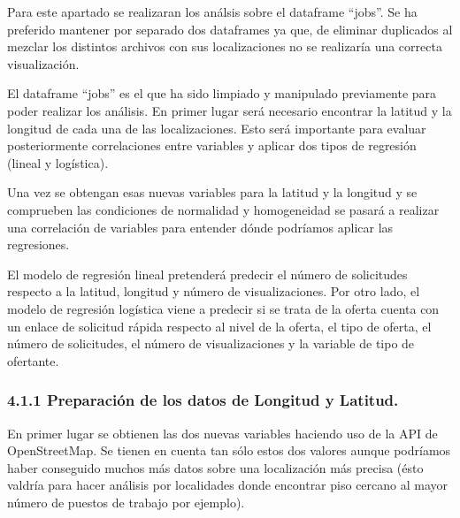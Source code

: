 \documentclass[
]{article}
\begin{document}
Para este apartado se realizaran los análsis sobre el dataframe
``jobs''. Se ha preferido mantener por separado dos dataframes ya que,
de eliminar duplicados al mezclar los distintos archivos con sus
localizaciones no se realizaría una correcta visualización.

El dataframe ``jobs'' es el que ha sido limpiado y manipulado
previamente para poder realizar los análisis. En primer lugar será
necesario encontrar la latitud y la longitud de cada una de las
localizaciones. Esto será importante para evaluar posteriormente
correlaciones entre variables y aplicar dos tipos de regresión (lineal y
logística).

Una vez se obtengan esas nuevas variables para la latitud y la longitud
y se comprueben las condiciones de normalidad y homogeneidad se pasará a
realizar una correlación de variables para entender dónde podríamos
aplicar las regresiones.

El modelo de regresión lineal pretenderá predecir el número de
solicitudes respecto a la latitud, longitud y número de visualizaciones.
Por otro lado, el modelo de regresión logística viene a predecir si se
trata de la oferta cuenta con un enlace de solicitud rápida respecto al
nivel de la oferta, el tipo de oferta, el número de solicitudes, el
número de visualizaciones y la variable de tipo de ofertante.

\hypertarget{preparaciuxf3n-de-los-datos-de-longitud-y-latitud.}{%
\subsubsection{4.1.1 Preparación de los datos de Longitud y
Latitud.}\label{preparaciuxf3n-de-los-datos-de-longitud-y-latitud.}}

En primer lugar se obtienen las dos nuevas variables haciendo uso de la
API de OpenStreetMap. Se tienen en cuenta tan sólo estos dos valores
aunque podríamos haber conseguido muchos más datos sobre una
localización más precisa (ésto valdría para hacer análisis por
localidades donde encontrar piso cercano al mayor número de puestos de
trabajo por ejemplo).
\end{document}
